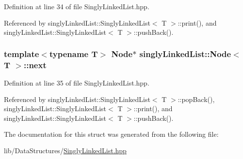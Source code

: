 Definition at line 34 of file Singly\-Linked\-List.\-hpp.



Referenced by singly\-Linked\-List\-::\-Singly\-Linked\-List$<$ T $>$\-::print(), and singly\-Linked\-List\-::\-Singly\-Linked\-List$<$ T $>$\-::push\-Back().

\hypertarget{structsinglyLinkedList_1_1Node_a1f041f25521a6bfc726f4bff1426e0b3}{
\subsubsection[{next}]{\setlength{\rightskip}{0pt plus 5cm}template$<$typename T$>$ {\bf Node}$\ast$ {\bf singly\-Linked\-List\-::\-Node}$<$ T $>$\-::next}}\label{structsinglyLinkedList_1_1Node_a1f041f25521a6bfc726f4bff1426e0b3}


Definition at line 35 of file Singly\-Linked\-List.\-hpp.



Referenced by singly\-Linked\-List\-::\-Singly\-Linked\-List$<$ T $>$\-::pop\-Back(), singly\-Linked\-List\-::\-Singly\-Linked\-List$<$ T $>$\-::print(), and singly\-Linked\-List\-::\-Singly\-Linked\-List$<$ T $>$\-::push\-Back().



The documentation for this struct was generated from the following file\-:\begin{DoxyCompactItemize}
\item 
lib/\-Data\-Structures/\hyperlink{SinglyLinkedList_8hpp}{Singly\-Linked\-List.\-hpp}\end{DoxyCompactItemize}
